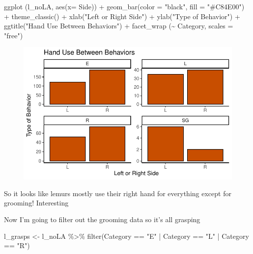 \documentclass[
  letterpaper,
  DIV=11,
  numbers=noendperiod]{scrartcl}
\newenvironment{Shaded}{\begin{snugshade}}{\end{snugshade}}
\newcommand{\AttributeTok}[1]{\textcolor[rgb]{0.40,0.45,0.13}{#1}}
\newcommand{\FunctionTok}[1]{\textcolor[rgb]{0.28,0.35,0.67}{#1}}
\newcommand{\NormalTok}[1]{\textcolor[rgb]{0.00,0.23,0.31}{#1}}
\newcommand{\OtherTok}[1]{\textcolor[rgb]{0.00,0.23,0.31}{#1}}
\newcommand{\SpecialCharTok}[1]{\textcolor[rgb]{0.37,0.37,0.37}{#1}}
\newcommand{\StringTok}[1]{\textcolor[rgb]{0.13,0.47,0.30}{#1}}
\begin{document}
\begin{Shaded}
\begin{Highlighting}[]
\FunctionTok{ggplot}\NormalTok{ (l\_noLA, }\FunctionTok{aes}\NormalTok{(}\AttributeTok{x=}\NormalTok{ Side)) }\SpecialCharTok{+}
  \FunctionTok{geom\_bar}\NormalTok{(}\AttributeTok{color =} \StringTok{"black"}\NormalTok{, }\AttributeTok{fill =} \StringTok{"\#C84E00"}\NormalTok{) }\SpecialCharTok{+}
  \FunctionTok{theme\_classic}\NormalTok{() }\SpecialCharTok{+}
  \FunctionTok{xlab}\NormalTok{(}\StringTok{"Left or Right Side"}\NormalTok{) }\SpecialCharTok{+}
  \FunctionTok{ylab}\NormalTok{(}\StringTok{"Type of Behavior"}\NormalTok{) }\SpecialCharTok{+}
  \FunctionTok{ggtitle}\NormalTok{(}\StringTok{"Hand Use Between Behaviors"}\NormalTok{) }\SpecialCharTok{+}
  \FunctionTok{facet\_wrap}\NormalTok{ (}\SpecialCharTok{\textasciitilde{}}\NormalTok{ Category, }\AttributeTok{scales =} \StringTok{"free"}\NormalTok{)}
\end{Highlighting}
\end{Shaded}

\begin{figure}[H]

{\centering \includegraphics{LeftyLemurs_files/figure-pdf/unnamed-chunk-26-1.pdf}

}

\end{figure}

So it looks like lemurs mostly use their right hand for everything
except for grooming! Interesting

Now I'm going to filter out the grooming data so it's all grasping

\begin{Shaded}
\begin{Highlighting}[]
\NormalTok{l\_grasps }\OtherTok{\textless{}{-}}
\NormalTok{l\_noLA }\SpecialCharTok{\%\textgreater{}\%} 
  \FunctionTok{filter}\NormalTok{(Category }\SpecialCharTok{==} \StringTok{"E"}  \SpecialCharTok{|}\NormalTok{  Category }\SpecialCharTok{==} \StringTok{"L"} \SpecialCharTok{|}\NormalTok{  Category }\SpecialCharTok{==} \StringTok{"R"}\NormalTok{)}
\end{Highlighting}
\end{Shaded}
\end{document}

